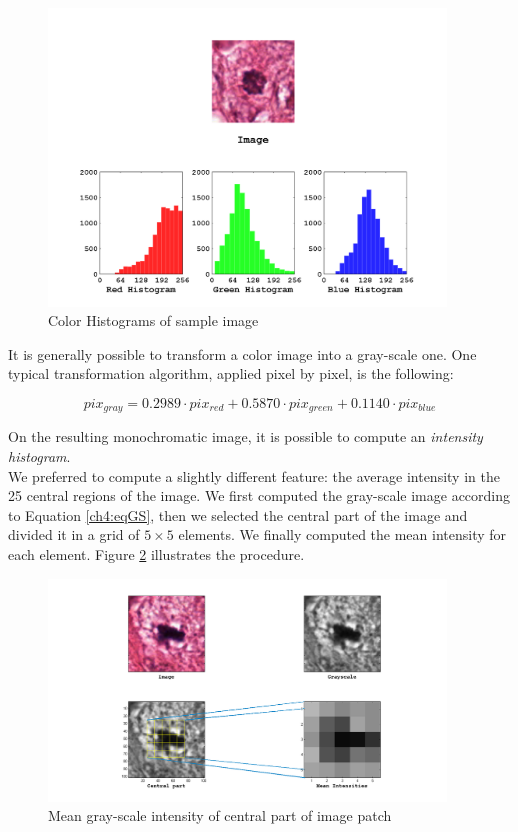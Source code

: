 \begin{figure}[!hbt]
  \centering
    \includegraphics[width=0.94\textwidth]{./images/histIM.png}
  \caption[Color Histograms]{Color Histograms of sample image}
  \label{ch4:fig2}
\end{figure}  

It is generally possible to transform a color image into a gray-scale one. One typical transformation algorithm, applied pixel by pixel, is the following:

\begin{equation}
 \label{ch4:eqGS}
 pix_{gray} = 0.2989 \cdot pix_{red} + 0.5870 \cdot pix_{green} + 0.1140 \cdot pix_{blue}
\end{equation}

On the resulting monochromatic image, it is possible to compute an \textit{intensity histogram}.\\
We preferred to compute a slightly different feature: the average intensity in the 25 central regions of the image.
We first computed the gray-scale image according to Equation \ref{ch4:eqGS}, then we selected the central part of the image and divided it in a grid of $5\times5$ elements.
We finally computed the mean intensity for each element. Figure \ref{ch4:fig3} illustrates the procedure.

\begin{figure}[!hbt]
  \centering
    \includegraphics[width=0.94\textwidth]{./images/GSintens1.png}
  \caption[Example of mean gray-scale intensities feature]{Mean gray-scale intensity of central part of image patch}
  \label{ch4:fig3}
\end{figure}


